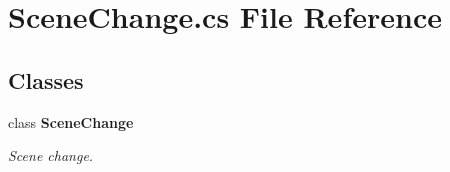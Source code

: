 \section{Scene\+Change.\+cs File Reference}
\label{_scene_change_8cs}
\subsection*{Classes}
\begin{DoxyCompactItemize}
\item 
class {\bf Scene\+Change}
\begin{DoxyCompactList}\small\item\em Scene change. \end{DoxyCompactList}\end{DoxyCompactItemize}
